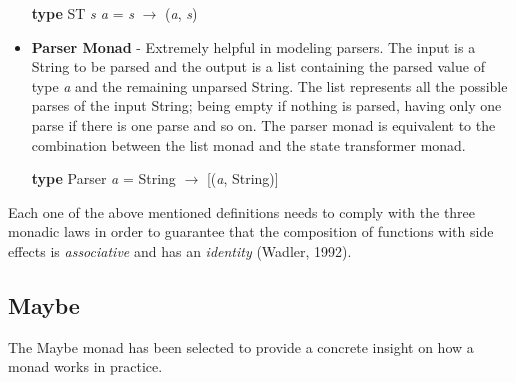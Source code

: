 \documentclass[a4paper, onecolumn]{article}
\begin{document}
\begin{itemize}
    \begin{center}
        \textbf{type} ST \textit{s a} = \textit{s} $\rightarrow$ (\textit{a}, \textit{s})
    \end{center}
    \item \textbf{Parser Monad} - Extremely helpful in modeling parsers. The input is a String to be parsed and the output is a list containing the parsed value of type \textit{a} and the remaining unparsed String. The list represents all the possible parses of the input String; being empty if nothing is parsed, having only one parse if there is one parse and so on. The parser monad is equivalent to the combination between the list monad and the state transformer monad.  
    \begin{center}
        \textbf{type} Parser \textit{a} = String $\rightarrow$ [(\textit{a}, String)] 
    \end{center}
\end{itemize}
Each one of the above mentioned definitions needs to comply with the three monadic laws in order to guarantee that the composition of functions with side effects is \textit{associative} and has an \textit{identity} (Wadler, 1992).

\subsection{Maybe}
The Maybe monad has been selected to provide a concrete insight on how a monad works in practice.   
\end{document}
